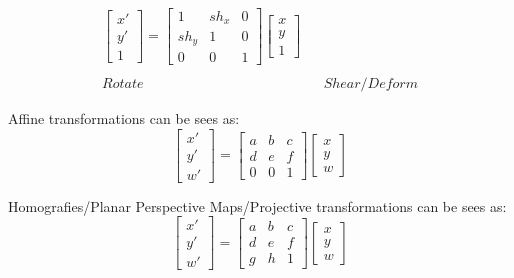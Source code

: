 \documentclass{article}
\begin{document}
\begin{equation*}
\begin{matrix}
        \begin{bmatrix}
            x' \\ y' \\ 1
        \end{bmatrix} = 
        \begin{bmatrix}
            1 & sh_x & 0 \\
            sh_y & 1 & 0 \\
            0 & 0 & 1
        \end{bmatrix}
        \begin{bmatrix}
            x \\ y \\ 1
        \end{bmatrix} \\
        \\
        Rotate & & Shear/Deform
    \end{matrix}
\end{equation*}

\newpage

Affine transformations can be sees as:
\begin{equation*}
    \begin{bmatrix}
        x' \\ y' \\ w'
    \end{bmatrix} = 
    \begin{bmatrix}
        a & b & c \\
        d & e & f \\
        0 & 0 & 1
    \end{bmatrix}
    \begin{bmatrix}
        x \\ y \\ w
    \end{bmatrix}
\end{equation*}

Homografies/Planar Perspective Maps/Projective transformations can be sees as:
\begin{equation*}
    \begin{bmatrix}
        x' \\ y' \\ w'
    \end{bmatrix} = 
    \begin{bmatrix}
        a & b & c \\
        d & e & f \\
        g & h & 1
    \end{bmatrix}
    \begin{bmatrix}
        x \\ y \\ w
    \end{bmatrix}
\end{equation*}
\end{document}
